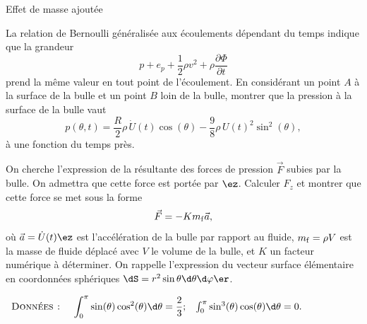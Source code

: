 \begin{exo}[PC][2][devoir]{Effet de masse ajoutée}
\begin{quest}
\item La relation de Bernoulli généralisée aux écoulements dépendant du temps indique que la grandeur
$$p+e_p+\dfrac{1}{2}\rho v^{2}+\rho\dfrac{\partial \Phi}{\partial t}$$
prend la même valeur en tout point de l'écoulement. En considérant un point $A$ à la surface de la bulle et un point $B$ loin de la bulle, montrer que la pression à la surface de la bulle vaut
\begin{equation*}
p(\theta,t)= \frac{R}{2} \rho \,\dot{U} (t) \cos(\theta) -\frac{9}{8}\rho\, U(t)^2\sin^2(\theta),
\end{equation*}
à une fonction du temps près.
 \item  On cherche l'expression de la résultante des forces de pression $\vec{F}$ subies par la bulle. On admettra que cette force est portée par $\ez$.
Calculer $F_z$ et montrer que cette force se met sous la forme
$$\Vec{F} = -K m_{\rm f} \Vec{a},$$
où $\Vec{a}=\dot{U}(t)\ez$ est l’accélération de la bulle par rapport au fluide, $m_{\rm f}=\rho V$ est la masse de fluide déplacé avec $V$ le volume de la bulle, et $K$ un facteur numérique à déterminer. On rappelle l'expression du vecteur surface élémentaire en coordonnées sphériques  $\dS = r^2 \sin \theta \d \theta \d \varphi \er$.


\end{quest}
\noindent
$\begin{array}{llll}
\textsc{Données :~} &
\displaystyle \int_0^\pi \sin (\theta) \cos^2(\theta) \d \theta = \frac{2}{3}; & \int_0^\pi \sin^3(\theta) \cos(\theta) \d \theta = 0.
\end{array}
$
\end{exo}

